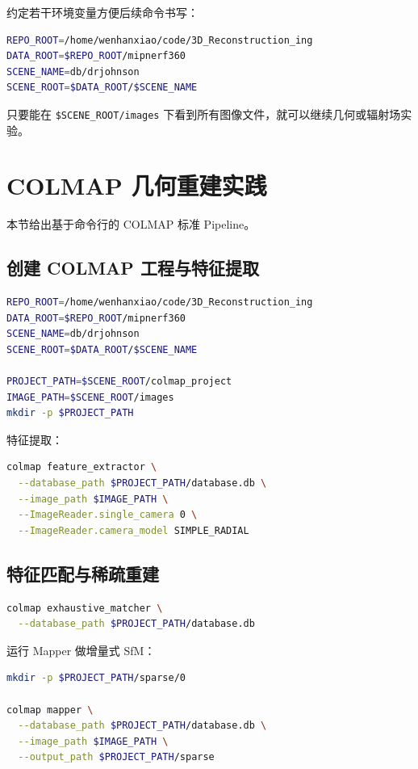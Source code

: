\documentclass[12pt]{ctexart}
\begin{document}
约定若干环境变量方便后续命令书写：
\begin{lstlisting}[language=bash]
REPO_ROOT=/home/wenhanxiao/code/3D_Reconstruction_ing
DATA_ROOT=$REPO_ROOT/mipnerf360
SCENE_NAME=db/drjohnson
SCENE_ROOT=$DATA_ROOT/$SCENE_NAME
\end{lstlisting}

只要能在 \texttt{\$SCENE\_ROOT/images} 下看到所有图像文件，就可以继续几何或辐射场实验。

\section{COLMAP 几何重建实践}

本节给出基于命令行的 COLMAP 标准 Pipeline。

\subsection{创建 COLMAP 工程与特征提取}

\begin{lstlisting}[language=bash]
REPO_ROOT=/home/wenhanxiao/code/3D_Reconstruction_ing
DATA_ROOT=$REPO_ROOT/mipnerf360
SCENE_NAME=db/drjohnson
SCENE_ROOT=$DATA_ROOT/$SCENE_NAME

PROJECT_PATH=$SCENE_ROOT/colmap_project
IMAGE_PATH=$SCENE_ROOT/images
mkdir -p $PROJECT_PATH
\end{lstlisting}

特征提取：
\begin{lstlisting}[language=bash]
colmap feature_extractor \
  --database_path $PROJECT_PATH/database.db \
  --image_path $IMAGE_PATH \
  --ImageReader.single_camera 0 \
  --ImageReader.camera_model SIMPLE_RADIAL
\end{lstlisting}

\subsection{特征匹配与稀疏重建}

\begin{lstlisting}[language=bash]
colmap exhaustive_matcher \
  --database_path $PROJECT_PATH/database.db
\end{lstlisting}

运行 Mapper 做增量式 SfM：
\begin{lstlisting}[language=bash]
mkdir -p $PROJECT_PATH/sparse/0

colmap mapper \
  --database_path $PROJECT_PATH/database.db \
  --image_path $IMAGE_PATH \
  --output_path $PROJECT_PATH/sparse
\end{lstlisting}
\end{document}
